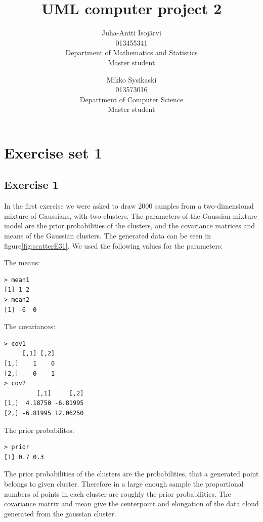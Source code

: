\documentclass{article}
\begin{document}
\title{UML computer project 2}
\author{
Juha-Antti Isojärvi\\
013455341 \\
Department of Mathematics and Statistics\\
Master student
\and
Mikko Sysikaski\\
013573016\\
Department of Computer Science\\
Master student}
\date{}
\maketitle

\section{Exercise set 1}

\subsection{Exercise 1}
In the first exercise we were asked to draw 2000 samples from a
two-dimensional mixture of Gaussians, with two clusters. The
parameters of the Gaussian mixture model are the prior probabilities
of the clusters, and the covariance matrices and means of the Gaussian
clusters. The generated data can be seen in
figure\ref{fig:scatterE31}. We used the following values for the
parameters:

\noindent The means: 
\begin{verbatim}
> mean1
[1] 1 2
> mean2
[1] -6  0
\end{verbatim}

\noindent The covariances:
\begin{verbatim}
> cov1
     [,1] [,2]
[1,]    1    0
[2,]    0    1
> cov2
         [,1]     [,2]
[1,]  4.18750 -6.81995
[2,] -6.81995 12.06250
\end{verbatim}

\noindent The prior probabilites: 
\begin{verbatim}
> prior
[1] 0.7 0.3
\end{verbatim}

The prior probabilities of the clusters are the probabilities, that a
generated point belongs to given cluster. Therefore in a large enough
sample the proportional numbers of points in each cluster are roughly
the prior probabilities. The covariance matrix and mean give the
centerpoint and elongation of the data cloud generated from the
gaussian cluster. 
\end{document}
